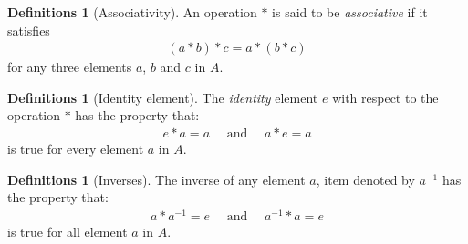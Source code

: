 \documentclass[nohyper,nobib]{tufte-handout}
\theoremstyle{definition}
\newtheorem{defns}[thm]{Definitions}
\theoremstyle{remark}
\begin{document}
\begin{defns}[Associativity]
    An operation $*$ is said to be \emph{associative} if it satisfies 
        \begin{align}
            (a * b) * c = a * (b * c)
        \end{align}
        for any three elements $a$, $b$ and $c$ in $A$.
\end{defns}

\begin{defns}[Identity element]
    The \emph{identity} element $e$ with respect to the operation $*$ has the property that:
        \begin{align}
            e * a  = a \quad\text{ and }\quad a * e = a
        \end{align}
        is true for every element $a$ in $A$.
\end{defns}

\begin{defns}[Inverses]
    The inverse of any element $a$, item denoted by $a^{-1}$ has the property that:
        \begin{align}
            a * a^{-1} = e  \quad\text{ and }\quad a^{-1} * a = e
        \end{align}
        is true for all element $a$ in $A$.
\end{defns}
\end{document}
